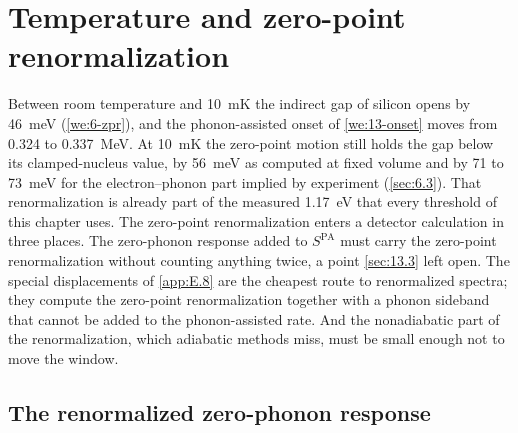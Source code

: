\section{Temperature and zero-point renormalization}\label{sec:13.7}

Between room temperature and \SI{10}{mK} the indirect gap of silicon opens by \SI{46}{meV} (\cref{we:6-zpr}), and the phonon-assisted onset of \cref{we:13-onset} moves from 0.324 to \SI{0.337}{MeV}. At \SI{10}{mK} the zero-point motion still holds the gap below its clamped-nucleus value, by \SI{56}{meV} as computed at fixed volume and by 71 to \SI{73}{meV} for the electron--phonon part implied by experiment (\cref{sec:6.3}). That renormalization is already part of the measured \SI{1.17}{eV} that every threshold of this chapter uses. The zero-point renormalization enters a detector calculation in three places. The zero-phonon response added to $S^{\mathrm{PA}}$ must carry the zero-point renormalization without counting anything twice, a point \cref{sec:13.3} left open. The special displacements of \cref{app:E.8} are the cheapest route to renormalized spectra; they compute the zero-point renormalization together with a phonon sideband that cannot be added to the phonon-assisted rate. And the nonadiabatic part of the renormalization, which adiabatic methods miss, must be small enough not to move the window.

\subsection{The renormalized zero-phonon response}

